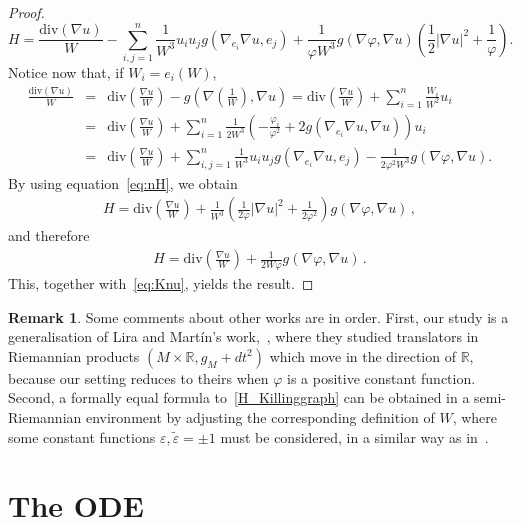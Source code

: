 \documentclass[oneside,12pt]{amsart}
\theoremstyle{definition}
\newtheorem{remark}[lemma]{Remark}
\begin{document}
\begin{proof}
\begin{equation}
H=\frac{\mathrm{div}(\nabla u)}{W} -\sum^{n}_{i,j=1}\frac{1}{W^3}u_iu_jg(\nabla_{e_i}\nabla u,e_j)+\frac{1}{\varphi W^3}g(\nabla \varphi,\nabla u)\left(\frac{1}{2}|\nabla u|^2+\frac{1}{\varphi}\right).
\end{equation}
Notice now that, if $W_i = e_i (W)$,
\begin{eqnarray*}
\frac{\mathrm{div}(\nabla u)}{W}&=&
\mathrm{div}\left(\frac{\nabla u}{W}\right) -g\left(\nabla\left(\frac{1}{W}\right),\nabla u\right) =\mathrm{div}\left(\frac{\nabla u}{W}\right)+\sum_{i=1}^n\frac{W_i}{W^2}u_i\\
&=&\mathrm{div}\left(\frac{\nabla u}{W}\right)
+\sum_{i=1}^n  \frac{1}{2W^3}\left( -\frac{\varphi_i}{\varphi^2}+2g(\nabla_{e_i}\nabla u,\nabla u)\right)u_i\\
&=&\mathrm{div}\left(\frac{\nabla u}{W}\right) +\sum_{i,j=1}^n\frac{1}{W^3}u_iu_jg(\nabla_{e_i}\nabla u,e_j)-\frac{1}{2\varphi^2W^3}g(\nabla \varphi,\nabla u).
\end{eqnarray*}
By using equation~\eqref{eq:nH}, we obtain
\begin{eqnarray*}
H=\mathrm{div}\left(\frac{\nabla u}{W}\right)+\frac{1}{W^3}\left(\frac{1}{2\varphi}|\nabla u|^2+\frac{1}{2\varphi^2}\right)g(\nabla \varphi,\nabla u) \, ,
\end{eqnarray*}
and therefore
\begin{eqnarray}\label{H_Killinggraph}
H=\mathrm{div}\left(\frac{\nabla u}{W}\right)+\frac{1}{2W\varphi}g(\nabla \varphi,\nabla u) \, .
\end{eqnarray}
This, together with~\eqref{eq:Knu}, yields the result.
\end{proof}
\begin{remark} Some comments about other works are in order. First, our study is a generalisation of Lira and Mart{\'i}n's work,~\cite{LM}, where they studied translators in Riemannian products $(M\times\mathbb{R},g_M+ dt^2)$ which move in the direction of $\mathbb{R}$, because our setting reduces to theirs when $\varphi$ is a positive constant function. Second, a formally equal formula to~\eqref{H_Killinggraph} can be obtained in a semi-Riemannian environment by adjusting the corresponding definition of $W$, where some constant functions $\varepsilon,\widetilde{\varepsilon}=\pm 1$ must be considered, in a similar way as in~\cite{LO}. 
\end{remark}

\section{The ODE} \label{sec:ODE}
\end{document}
